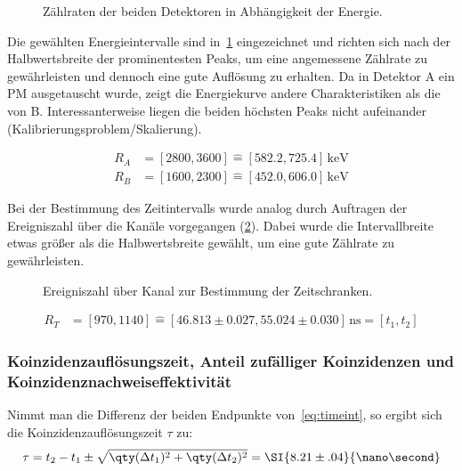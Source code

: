 \documentclass[slug=PET, room=Andreas-Schubert-Bau\,\ 424A, supervisor=Carsten\ Bittrich, coursedate=10.\ 01.\ 2020]{../../Lab_Report_LaTeX/lab_report}
\begin{document}
\begin{figure}[h]\centering
  
  \caption{Z\"ahlraten der beiden Detektoren in Abhängigkeit der Energie.}
  \label{fig:calibration-mid_over_energy}
\end{figure}

Die gew\"ahlten Energieintervalle sind
in~\ref{fig:calibration-mid_over_energy} eingezeichnet und richten
sich nach der Halbwertsbreite der prominentesten Peaks, um eine
angemessene Z\"ahlrate zu gew\"ahrleisten und dennoch eine gute
Auflösung zu erhalten. Da in Detektor A ein PM ausgetauscht wurde,
zeigt die Energiekurve andere Charakteristiken als die von
B. Interessanterweise liegen die beiden h\"ochsten Peaks nicht
aufeinander (Kalibrierungsproblem/Skalierung).

\begin{align}
  \label{eq:fenster}
  R_A &= [2800, 3600] \hat{=} [582.2, 725.4]\,\si{\kilo\electronvolt}
  \\
  R_B &= [1600, 2300] \hat{=} [452.0, 606.0]\,\si{\kilo\electronvolt}
\end{align}

Bei der Bestimmung des Zeitintervalls wurde analog durch Auftragen der
Ereigniszahl \"uber die Kan\"ale vorgegangen
(\ref{fig:calibration-time_range}). Dabei wurde die Intervallbreite
etwas gr\"o\ss{}er als die Halbwertsbreite gew\"ahlt, um eine gute
Z\"ahlrate zu gew\"ahrleisten.

\begin{figure}[h]\centering
  
  \caption{Ereigniszahl \"uber Kanal zur Bestimmung der Zeitschranken.}
  \label{fig:calibration-time_range}
\end{figure}

\begin{align}
  \label{eq:timeint}
  R_T &= [970, 1140] \hat{=} [46.813\pm 0.027, 55.024\pm
        0.030]\,\si{\nano\second} = [t_1, t_2]
\end{align}

\subsubsection{Koinzidenzaufl\"osungszeit, Anteil zuf\"alliger Koinzidenzen und Koinzidenznachweiseffektivit\"at}
\label{sec:koaufl}

Nimmt man die Differenz der beiden Endpunkte von~\eqref{eq:timeint}, so
ergibt sich die Koinzidenzaufl\"osungszeit \(\tau\) zu:
\begin{equation}
  \label{eq:koauf}
  \tau = t_2 - t_1 \pm \sqrt{\qty(\Delta t_1)^2 + \qty(\Delta t_2)^2}
  = \SI{8.21\pm .04}{\nano\second}
\end{equation}
\end{document}
